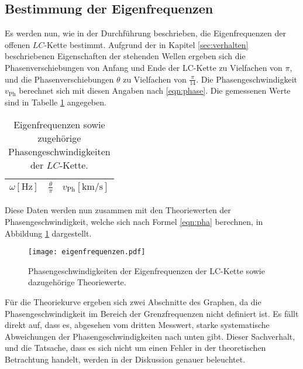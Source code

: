 \subsection{Bestimmung der Eigenfrequenzen}
Es werden nun, wie in der Durchführung beschrieben, die Eigenfrequenzen der offenen $LC$-Kette bestimmt.
Aufgrund der in Kapitel \ref{sec:verhalten} beschriebenen Eigenschaften der stehenden Wellen ergeben sich die Phasenverschiebungen von Anfang und Ende der LC-Kette zu Vielfachen von $\pi$, und die Phasenverschiebungen $\theta$ zu Vielfachen von $\frac{\pi}{14}$.
Die Phasengeschwindigkeit $v_{\text{Ph}}$ berechnet sich mit diesen Angaben nach \eqref{eqn:phase}.
Die gemessenen Werte sind in Tabelle \ref{tab:eigenfrequenzen} angegeben.
\begin{table}
  \centering
  \caption{Eigenfrequenzen sowie zugehörige Phasengeschwindigkeiten der $LC$-Kette.}
  \label{tab:eigenfrequenzen}
  \begin{tabular}{c c c}
    \toprule
    {$\omega [\si{\hertz}]$} & {$\frac{\theta}{\pi} $} & {$v_{\text{Ph}} [\si{\kilo\metre\per\second}] $}\\
    \midrule
    
    \bottomrule
  \end{tabular}
\end{table}
Diese Daten werden nun zusammen mit den Theoriewerten der Phasengeschwindigkeit, welche sich nach Formel \ref{eqn:pha} berechnen, in Abbildung \ref{fig:phasengeschwindigkeiten} dargestellt.
\begin{figure}[H]
  \centering
  \texttt{[image: eigenfrequenzen.pdf]}
  \caption{Phasengeschwindigkeiten der Eigenfrequenzen der LC-Kette sowie dazugehörige Theoriewerte.}
  \label{fig:phasengeschwindigkeiten}
\end{figure}
Für die Theoriekurve ergeben sich zwei Abschnitte des Graphen, da die Phasengeschwindigkeit im Bereich der Grenzfrequenzen nicht definiert ist.
Es fällt direkt auf, dass es, abgesehen vom dritten Messwert, starke systematische Abweichungen der Phasengeschwindigkeiten nach unten gibt.
Dieser Sachverhalt, und die Tatsache, dass es sich nicht um einen Fehler in der theoretischen Betrachtung handelt, werden in der Diskussion genauer beleuchtet.

